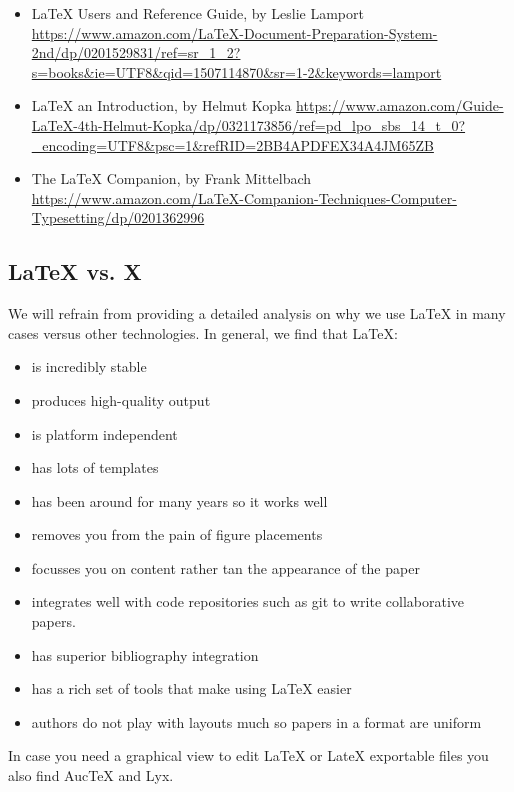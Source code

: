 \begin{itemize}

\item
  LaTeX Users and Reference Guide, by Leslie Lamport
  \url{https://www.amazon.com/LaTeX-Document-Preparation-System-2nd/dp/0201529831/ref=sr_1_2?s=books\&ie=UTF8\&qid=1507114870\&sr=1-2\&keywords=lamport}
\item
  LaTeX an Introduction, by Helmut Kopka
  \url{https://www.amazon.com/Guide-LaTeX-4th-Helmut-Kopka/dp/0321173856/ref=pd_lpo_sbs_14_t_0?_encoding=UTF8\&psc=1\&refRID=2BB4APDFEX34A4JM65ZB}
\item
  The LaTeX Companion, by Frank Mittelbach
  \url{https://www.amazon.com/LaTeX-Companion-Techniques-Computer-Typesetting/dp/0201362996}
\end{itemize}



\subsection{LaTeX vs. X}\label{latex-vs.-x}

We will refrain from providing a detailed analysis on why we use LaTeX
in many cases versus other technologies. In general, we find that LaTeX:

\begin{itemize}

\item
  is incredibly stable
\item
  produces high-quality output
\item
  is platform independent
\item
  has lots of templates
\item
  has been around for many years so it works well
\item
  removes you from the pain of figure placements
\item
  focusses you on content rather tan the appearance of the paper
\item
  integrates well with code repositories such as git to write
  collaborative papers.
\item
  has superior bibliography integration
\item
  has a rich set of tools that make using LaTeX easier
\item
  authors do not play with layouts much so papers in a format are
  uniform
\end{itemize}

In case you need a graphical view to edit LaTeX or LateX exportable
files you also find AucTeX and Lyx.

